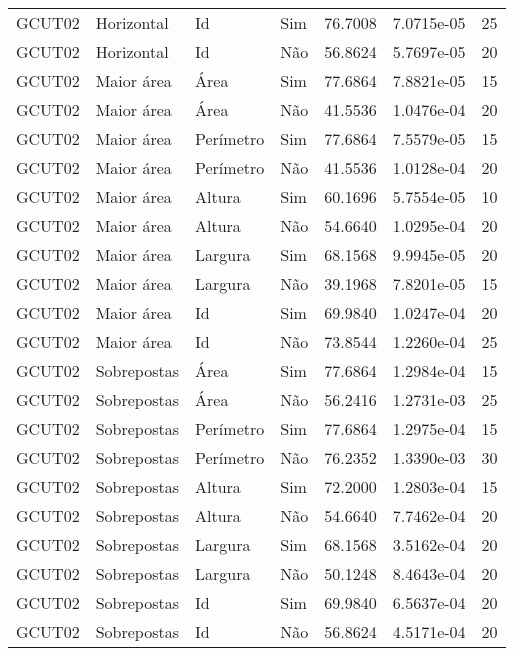 \begin{tabular}{llllrrr}
    GCUT02    & Horizontal  & Id        & Sim         & 76.7008      & 7.0715e-05 & 25       \\
    GCUT02    & Horizontal  & Id        & Não         & 56.8624      & 5.7697e-05 & 20       \\
    GCUT02    & Maior área  & Área      & Sim         & 77.6864      & 7.8821e-05 & 15       \\
    GCUT02    & Maior área  & Área      & Não         & 41.5536      & 1.0476e-04 & 20       \\
    GCUT02    & Maior área  & Perímetro & Sim         & 77.6864      & 7.5579e-05 & 15       \\
    GCUT02    & Maior área  & Perímetro & Não         & 41.5536      & 1.0128e-04 & 20       \\
    GCUT02    & Maior área  & Altura    & Sim         & 60.1696      & 5.7554e-05 & 10       \\
    GCUT02    & Maior área  & Altura    & Não         & 54.6640      & 1.0295e-04 & 20       \\
    GCUT02    & Maior área  & Largura   & Sim         & 68.1568      & 9.9945e-05 & 20       \\
    GCUT02    & Maior área  & Largura   & Não         & 39.1968      & 7.8201e-05 & 15       \\
    GCUT02    & Maior área  & Id        & Sim         & 69.9840      & 1.0247e-04 & 20       \\
    GCUT02    & Maior área  & Id        & Não         & 73.8544      & 1.2260e-04 & 25       \\
    GCUT02    & Sobrepostas & Área      & Sim         & 77.6864      & 1.2984e-04 & 15       \\
    GCUT02    & Sobrepostas & Área      & Não         & 56.2416      & 1.2731e-03 & 25       \\
    GCUT02    & Sobrepostas & Perímetro & Sim         & 77.6864      & 1.2975e-04 & 15       \\
    GCUT02    & Sobrepostas & Perímetro & Não         & 76.2352      & 1.3390e-03 & 30       \\
    GCUT02    & Sobrepostas & Altura    & Sim         & 72.2000      & 1.2803e-04 & 15       \\
    GCUT02    & Sobrepostas & Altura    & Não         & 54.6640      & 7.7462e-04 & 20       \\
    GCUT02    & Sobrepostas & Largura   & Sim         & 68.1568      & 3.5162e-04 & 20       \\
    GCUT02    & Sobrepostas & Largura   & Não         & 50.1248      & 8.4643e-04 & 20       \\
    GCUT02    & Sobrepostas & Id        & Sim         & 69.9840      & 6.5637e-04 & 20       \\
    GCUT02    & Sobrepostas & Id        & Não         & 56.8624      & 4.5171e-04 & 20       \\
    \hline
\end{tabular}